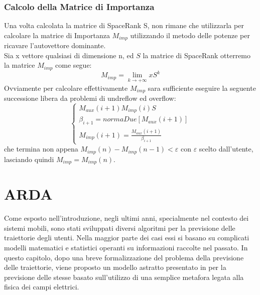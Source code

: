 \subsubsection{Calcolo della Matrice di Importanza}
Una volta calcolata la matrice di SpaceRank S, non rimane che utilizzarla per
calcolare la matrice di Importanza $M_{imp}$ utilizzando il metodo delle potenze
per ricavare l'autovettore dominante.\\
Sia x vettore qualsiasi di dimensione n, ed $S$ la matrice di SpaceRank otterremo
la matrice $M_{imp}$ come segue:
\begin{equation}
M_{imp} = \lim_{k \rightarrow +\infty} x S^{k}
\end{equation}
Ovviamente per calcolare effettivamente $M_{imp}$ sara sufficiente eseguire la seguente
successione libera da problemi di undreflow ed overflow:
\begin{equation}
\left\{\begin{matrix}
M_{aux}(i+1) M_{imp}(i)S
\\ \beta_{i+1} = normaDue[M_{aux}(i+1)]
\\ M_{imp}(i+1) = \frac{M_{aux}(i+1)}{\beta_{i+1}}
\end{matrix}\right.
\end{equation}
che termina non appena $ M_{imp}(n) - M_{imp}(n- 1) < \varepsilon $ con $ \varepsilon $ scelto dall'utente,
lasciando quindi $ M_{imp} = M_{imp}(n) $.

\section{ARDA}
Come esposto nell'introduzione, negli ultimi anni, specialmente nel contesto dei
sistemi mobili, sono stati sviluppati diversi algoritmi per la previsione delle
traiettorie degli utenti. Nella maggior parte dei casi essi si basano su complicati
modelli matematici e statistici operanti su informazioni raccolte nel passato. In
questo capitolo, dopo una breve formalizzazione del problema della previsione
delle traiettorie, viene proposto un modello astratto presentato in \cite{cit_49}
per la previsione delle stesse basato sull'utilizzo di una semplice metafora
legata alla fisica dei campi elettrici.

